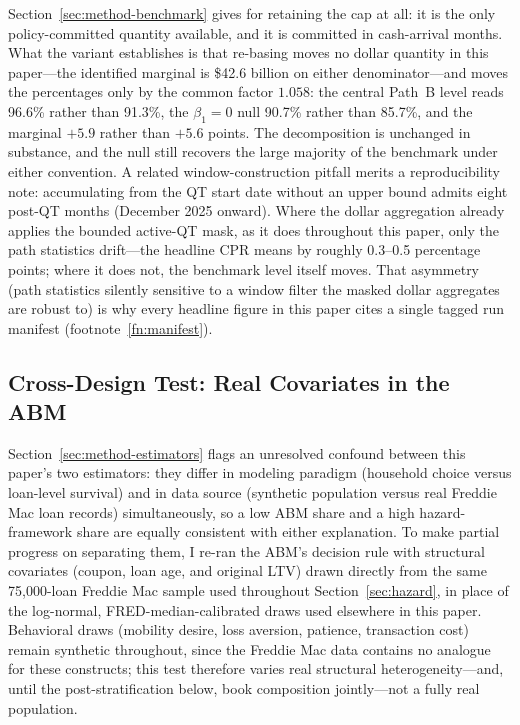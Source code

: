\documentclass[12pt]{article}
\begin{document}
Section~\ref{sec:method-benchmark} gives for retaining the cap at all: it is the only policy-committed quantity available, and it is committed in cash-arrival months. What the variant establishes is that re-basing moves no dollar quantity in this paper---the identified marginal is \$42.6 billion on either denominator---and moves the percentages only by the common factor $1.058$: the central Path~B level reads 96.6\% rather than 91.3\%, the $\beta_1 = 0$ null 90.7\% rather than 85.7\%, and the marginal $+5.9$ rather than $+5.6$ points. The decomposition is unchanged in substance, and the null still recovers the large majority of the benchmark under either convention. A related window-construction pitfall merits a reproducibility note: accumulating from the QT start date without an upper bound admits eight post-QT months (December 2025 onward). Where the dollar aggregation already applies the bounded active-QT mask, as it does throughout this paper, only the path statistics drift---the headline CPR means by roughly 0.3--0.5 percentage points; where it does not, the benchmark level itself moves. That asymmetry (path statistics silently sensitive to a window filter the masked dollar aggregates are robust to) is why every headline figure in this paper cites a single tagged run manifest (footnote~\ref{fn:manifest}).

\subsection{Cross-Design Test: Real Covariates in the ABM}\label{sec:robustness-crossdesign}

Section~\ref{sec:method-estimators} flags an unresolved confound between this paper's two estimators: they differ in modeling paradigm (household choice versus loan-level survival) and in data source (synthetic population versus real Freddie Mac loan records) simultaneously, so a low ABM share and a high hazard-framework share are equally consistent with either explanation. To make partial progress on separating them, I re-ran the ABM's decision rule with structural covariates (coupon, loan age, and original LTV) drawn directly from the same 75,000-loan Freddie Mac sample used throughout Section~\ref{sec:hazard}, in place of the log-normal, FRED-median-calibrated draws used elsewhere in this paper. Behavioral draws (mobility desire, loss aversion, patience, transaction cost) remain synthetic throughout, since the Freddie Mac data contains no analogue for these constructs; this test therefore varies real structural heterogeneity---and, until the post-stratification below, book composition jointly---not a fully real population.
\end{document}
